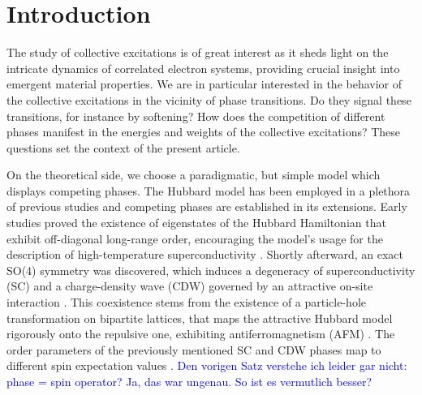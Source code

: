 \documentclass[
    reprint, 
    aps,
    preprintnumbers,
    twocolumn,
    prb,
    superscriptaddress
]{revtex4-2}
\newcommand{\blue}[1]{\textcolor{blue}{#1}}
\begin{document}
\maketitle


\section{Introduction}\label{sec:introduction}


The study of collective excitations is of great interest as it sheds light on the intricate dynamics of correlated electron systems, providing crucial insight into emergent material properties.
We are in particular interested in the behavior of the collective excitations in the vicinity of phase transitions.
Do they signal these transitions, for instance by softening? 
How does the competition of different phases manifest in the energies and weights of the collective excitations?
These questions set the context of the present article. 

On the theoretical side, we choose a paradigmatic, but simple model which displays competing phases.
The Hubbard model has been employed in a plethora of previous studies and competing phases are established in its extensions. 
Early studies proved the existence of eigenstates of the Hubbard Hamiltonian that exhibit off-diagonal long-range order, encouraging the model's usage for the description of high-temperature superconductivity \cite{yang89}.
Shortly afterward, an exact SO(4) symmetry was discovered, which induces a degeneracy of 
superconductivity (SC) and a charge-density wave (CDW) governed by an attractive on-site interaction \cite{yang90}.
This coexistence stems from the existence of a particle-hole transformation on bipartite lattices, 
that maps the attractive Hubbard model rigorously onto the repulsive one, 
exhibiting antiferromagnetism (AFM) \cite{Hirsch85}.
The order parameters of the previously mentioned SC and CDW phases map to different spin expectation values \cite{zitko15,lieb89}.
\blue{Den vorigen Satz verstehe ich leider gar nicht: phase = spin operator? Ja, das war ungenau. So ist es vermutlich besser?}
\end{document}
